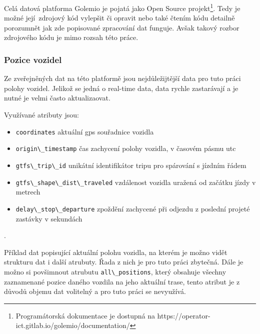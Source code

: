 \bigbreak

Celá datová platforma Golemio je pojatá jako Open Source projekt\footnote{Programátorská dokumentace je dostupná na https://operator-ict.gitlab.io/golemio/documentation/}. Tedy je možné její zdrojový kód vylepšit či opravit nebo také čtením kódu detailně porozumnět jak zde popisované zpracování dat funguje. Avšak takový rozbor zdrojového kódu je mimo rozsah této práce.

\subsubsection{Pozice vozidel}

Ze zveřejněných dat na této platformě jsou nejdůležijtější data pro tuto práci polohy vozidel. Jelikož se jedná o real-time data, data rychle zastarávají a je nutné je velmi často aktualizaovat.

\bigbreak

Využívané atributy jsou:

\begin{itemize}
	\item \verb-coordinates- aktuální \gls{gps} souřadnice vozidla

	\item \verb-origin\_timestamp- čas zachycení polohy vozidla, v časovém pásmu \gls{utc}

	\item \verb-gtfs\_trip\_id- unikátní identifikátor tripu pro spárování s jízdním řádem

	\item \verb-gtfs\_shape\_dist\_traveled- vzdálenost vozidla uražená od začátku jízdy v metrech

	\item \verb-delay\_stop\_departure- zpoždění zachycené při odjezdu z poslední projeté zastávky v sekundách
\end{itemize}.

Příklad dat popisující aktuální polohu vozidla, na kterém je možno vidět strukturu dat i další atrubuty. Řada z nich je pro tuto práci zbytečná. Dále je možno si povšimnout atrubutu \verb-all\_positions-, který obsahuje všechny zaznamenané pozice daného vozdila na jeho aktuální trase, tento atribut je z důvodů objemu dat volitelný a pro tuto práci se nevyužívá.

